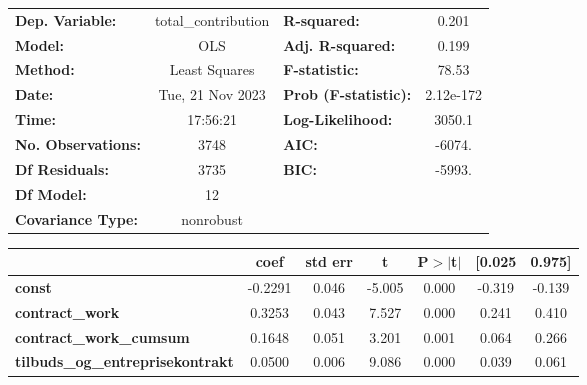 \begin{center}
\begin{tabular}{lclc}
\toprule
\textbf{Dep. Variable:}                   & total\_contribution & \textbf{  R-squared:         } &     0.201   \\
\textbf{Model:}                           &         OLS         & \textbf{  Adj. R-squared:    } &     0.199   \\
\textbf{Method:}                          &    Least Squares    & \textbf{  F-statistic:       } &     78.53   \\
\textbf{Date:}                            &   Tue, 21 Nov 2023  & \textbf{  Prob (F-statistic):} & 2.12e-172   \\
\textbf{Time:}                            &       17:56:21      & \textbf{  Log-Likelihood:    } &    3050.1   \\
\textbf{No. Observations:}                &          3748       & \textbf{  AIC:               } &    -6074.   \\
\textbf{Df Residuals:}                    &          3735       & \textbf{  BIC:               } &    -5993.   \\
\textbf{Df Model:}                        &            12       & \textbf{                     } &             \\
\textbf{Covariance Type:}                 &      nonrobust      & \textbf{                     } &             \\
\bottomrule
\end{tabular}
\begin{tabular}{lcccccc}
                                          & \textbf{coef} & \textbf{std err} & \textbf{t} & \textbf{P$> |$t$|$} & \textbf{[0.025} & \textbf{0.975]}  \\
\midrule
\textbf{const}                            &      -0.2291  &        0.046     &    -5.005  &         0.000        &       -0.319    &       -0.139     \\
\textbf{contract\_work}                   &       0.3253  &        0.043     &     7.527  &         0.000        &        0.241    &        0.410     \\
\textbf{contract\_work\_cumsum}           &       0.1648  &        0.051     &     3.201  &         0.001        &        0.064    &        0.266     \\
\textbf{tilbuds\_og\_entreprisekontrakt}  &       0.0500  &        0.006     &     9.086  &         0.000        &        0.039    &        0.061     \\

\end{tabular}
\end{center}
